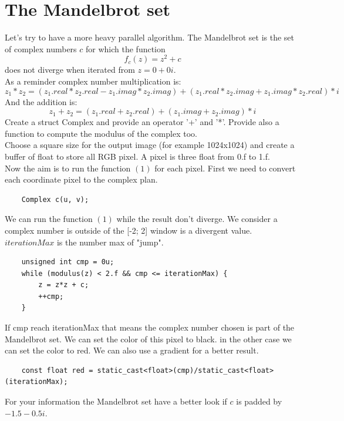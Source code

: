 \documentclass{article}
\begin{document}
\section{The Mandelbrot set}
Let's try to have a more heavy parallel algorithm. The Mandelbrot set is the set of complex numbers $c$ for which the function
\begin{equation}
f_c(z) = z^2+c
\end{equation}
does not diverge when iterated from $z = 0+0i$.\\
As a reminder complex number multiplication is:
\begin{equation}
z_1*z_2 = (z_1.real*z_2.real-z_1.imag*z_2.imag) + (z_1.real*z_2.imag + z_1.imag*z_2.real)*i
\end{equation}
And the addition is:
\begin{equation}
z_1 + z_2 = (z_1.real + z_2.real) + (z_1.imag + z_2.imag)*i
\end{equation}
Create a struct Complex and provide an operator '+' and '*'. Provide also a function to compute the modulus of the complex too.\\
Choose a square size for the output image (for example 1024x1024) and create a buffer of float to store all RGB pixel. A pixel is three float from 0.f to 1.f.\\
Now the aim is to run the function $(1)$ for each pixel. First we need to convert each coordinate pixel to the complex plan.
\begin{lstlisting}
	Complex c(u, v);
\end{lstlisting}
We can run the function $(1)$ while the result don't diverge. We consider a complex number is outside of the [-2; 2] window is a divergent value. $iterationMax$ is the number max of "jump".
\begin{lstlisting}
	unsigned int cmp = 0u;
	while (modulus(z) < 2.f && cmp <= iterationMax) {
		z = z*z + c;
		++cmp;
	}
\end{lstlisting}
If cmp reach iterationMax that means the complex number chosen is part of the Mandelbrot set. We can set the color of this pixel to black. in the other case we can set the color to red. We can also use a gradient for a better result.
\begin{lstlisting}
	const float red = static_cast<float>(cmp)/static_cast<float>(iterationMax);
\end{lstlisting}

For your information the Mandelbrot set have a better look if $c$ is padded by $-1.5 - 0.5i$.
\end{document}
